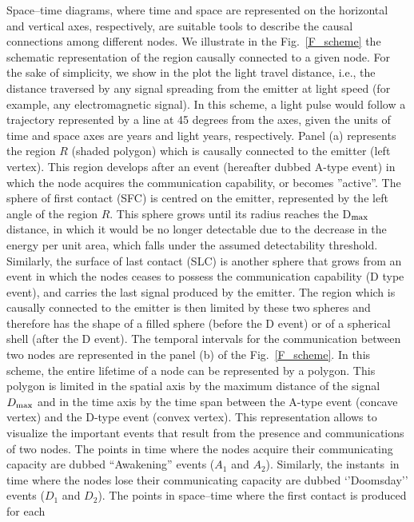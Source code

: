 \documentclass[crop]{CSLB}
\newcommand{\ceti}{node}
\newcommand{\cetis}{nodes}
\begin{document}
Space--time diagrams, where time and space are represented on the
horizontal and vertical axes, respectively, are suitable tools to
describe the causal connections among different nodes.
%
We illustrate in the Fig.~\ref{F_scheme} the schematic representation
of the region causally connected to a given \ceti{}.
%
For the sake of simplicity, we show in the plot the light travel
distance, i.e., the distance traversed by any signal spreading from
the emitter at light speed (for example, any electromagnetic signal).
%
In this scheme, a light pulse would follow a trajectory represented by
a line at 45 degrees from the axes, given the units of time and space
axes are years and light years, respectively.
%
Panel (a) represents the region $R$ (shaded polygon) which is causally
connected to the emitter (left vertex).
%
This region develops after an event (hereafter dubbed A-type event) in
which the node acquires the communication capability, or becomes
''active''.
%
The sphere of first contact (SFC) is centred on the emitter,
represented by the left angle of the region $R$.
%
This sphere grows until its radius reaches the D$_{\rm max}$ distance,
in which it would be no longer detectable due to the decrease in the
energy per unit area, which falls under the assumed detectability
threshold.
%
Similarly, the surface of last contact (SLC) is another sphere that
grows from an event in which the nodes ceases to possess the
communication capability (D type event), and carries the last signal
produced by the emitter.
%
The region which is causally connected to the emitter is then limited
by these two spheres and therefore has the shape of a filled sphere
(before the D event) or of a spherical shell (after the D event).
%
The temporal intervals for the communication between two \cetis{} are
represented in the panel (b) of the Fig.~\ref{F_scheme}.
%
In this scheme, the entire lifetime of a \ceti{} can be represented by
a polygon.
%
This polygon is limited in the spatial axis by the maximum distance of
the signal $D_{\rm max}$ and in the time axis by the time span between
the A-type event (concave vertex) and the D-type event (convex
vertex).
%
This representation allows to visualize the important events that
result from the presence and communications of two \cetis{}.
%
The points in time where the \cetis{} acquire their communicating
capacity are dubbed ``Awakening'' events ($A_1$ and $A_2$).
%
Similarly, the instants in time where the \cetis{} lose their
communicating capacity are dubbed ‘’Doomsday’’ events ($D_1$ and
$D_2$).
%
The points in space--time where the first contact is produced for each
\end{document}
